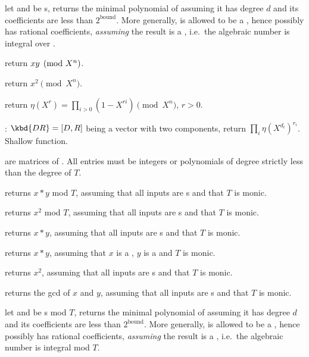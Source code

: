 let  and  be
s, returns the minimal polynomial of  assuming it has
degree $d$ and its coefficients are less than $2^{\text{bound}}$.
More generally,  is allowed to be a , hence possibly has
rational coefficients, \emph{assuming} the result is a , i.e.~the
algebraic number  is integral over .


 return $x\*y\pmod{X^n}$.

 return $x^2\pmod{X^n}$.

 return $\eta(X^r) = \prod_{i>0} (1-X^{ri})
\pmod{X^n}$, $r > 0$.

: $\kbd{DR}= [D,R]$ being a vector
with two  components, return $\prod_i \eta(X^{d_i})^{r_i}$.
Shallow function.


 are matrices of . All entries must be integers or
polynomials of degree strictly less than the degree of $T$.

 returns $x*y$ mod $T$, assuming
that all inputs are s and that $T$ is monic.

 returns $x^2$ mod $T$, assuming
that all inputs are s and that $T$ is monic.


 returns $x*y$, assuming
that all inputs are s and that $T$ is monic.

 returns $x*y$, assuming
that $x$ is a , $y$ is a  and $T$ is monic.

 returns $x^2$, assuming
that all inputs are s and that $T$ is monic.

 returns the gcd of $x$ and $y$,
assuming that all inputs are s and that $T$ is monic.

let  and  be s mod $T$, returns the minimal polynomial
of  assuming it has degree $d$ and its coefficients are less
than $2^{\text{bound}}$.  More generally,  is allowed to be a ,
hence possibly has rational coefficients, \emph{assuming} the result is a
, i.e.~the algebraic number  is integral mod $T$.

